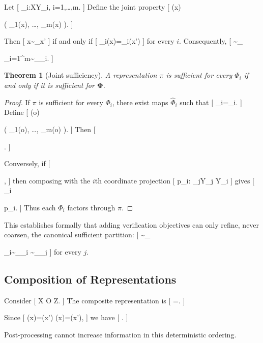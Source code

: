 \documentclass[11pt]{article}
\newtheorem{theorem}{Theorem} \newtheorem{proposition}{Proposition} \newtheorem{lemma}{Lemma} \newtheorem{corollary}{Corollary} \newtheorem{definition}{Definition} \newtheorem{remark}{Remark}
\begin{document}
Let
[
\Phi_i:\mathcal X\to\mathcal Y_i,
\qquad
i=1,\ldots,m.
]
Define the joint property
[
\mathbf{\Phi}(x)

\bigl(
\Phi_1(x),
\ldots,
\Phi_m(x)
\bigr).
]

Then
[
x\sim_{\mathbf{\Phi}}x'
]
if and only if
[
\Phi_i(x)=\Phi_i(x')
]
for every $i$. Consequently,
[
\sim_{\mathbf{\Phi}}

\bigcap_{i=1}^{m}\sim_{\Phi_i}.
]

\begin{theorem}[Joint sufficiency]
A representation $\pi$ is sufficient for every $\Phi_i$ if and only if it is sufficient for $\mathbf{\Phi}$.
\end{theorem}

\begin{proof}
If $\pi$ is sufficient for every $\Phi_i$, there exist maps $\widehat{\Phi}_i$ such that
[
\Phi_i=\widehat{\Phi}_i\circ\pi.
]
Define
[
\widehat{\mathbf{\Phi}}(o)

\bigl(
\widehat{\Phi}_1(o),
\ldots,
\widehat{\Phi}_m(o)
\bigr).
]
Then
[
\mathbf{\Phi}

\widehat{\mathbf{\Phi}}\circ\pi.
]

Conversely, if
[
\mathbf{\Phi}

\widehat{\mathbf{\Phi}}\circ\pi,
]
then composing with the $i$th coordinate projection
[
p_i:
\prod_j\mathcal Y_j
\to
\mathcal Y_i
]
gives
[
\Phi_i

p_i\circ\widehat{\mathbf{\Phi}}\circ\pi.
]
Thus each $\Phi_i$ factors through $\pi$.
\end{proof}

This establishes formally that adding verification objectives can only refine, never coarsen, the canonical sufficient partition:
[
\sim_{\mathbf{\Phi}}

\bigcap_i\sim_{\Phi_i}
\subseteq
\sim_{\Phi_j}
]
for every $j$.

\subsection{Composition of Representations}

Consider
[
\mathcal X
\xrightarrow{\pi}
\mathcal O
\xrightarrow{\rho}
\mathcal Z.
]
The composite representation is
[
\sigma=\rho\circ\pi.
]

Since
[
\pi(x)=\pi(x')
\Longrightarrow
\sigma(x)=\sigma(x'),
]
we have
[
\pi\succeq\sigma.
]

Post-processing cannot increase information in this deterministic ordering.
\end{document}
